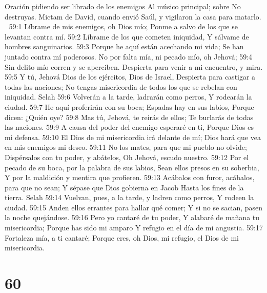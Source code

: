 Oración pidiendo ser librado de los enemigos 
Al músico principal; sobre No destruyas. Mictam de David, cuando envió Saúl, y vigilaron la casa para matarlo. 

59:1 Líbrame de mis enemigos, oh Dios mío; 
Ponme a salvo de los que se levantan contra mí. 
59:2 Líbrame de los que cometen iniquidad, 
Y sálvame de hombres sanguinarios. 
59:3 Porque he aquí están acechando mi vida; 
Se han juntado contra mí poderosos. 
No por falta mía, ni pecado mío, oh Jehová; 
59:4 Sin delito mío corren y se aperciben. 
Despierta para venir a mi encuentro, y mira. 
59:5 Y tú, Jehová Dios de los ejércitos, Dios de Israel, 
Despierta para castigar a todas las naciones; 
No tengas misericordia de todos los que se rebelan con iniquidad. Selah 
59:6 Volverán a la tarde, ladrarán como perros, 
Y rodearán la ciudad. 
59:7 He aquí proferirán con su boca; 
Espadas hay en sus labios, 
Porque dicen: ¿Quién oye? 
59:8 Mas tú, Jehová, te reirás de ellos; 
Te burlarás de todas las naciones. 
59:9 A causa del poder del enemigo esperaré en ti, 
Porque Dios es mi defensa. 
59:10 El Dios de mi misericordia irá delante de mí; 
Dios hará que vea en mis enemigos mi deseo. 
59:11 No los mates, para que mi pueblo no olvide; 
Dispérsalos con tu poder, y abátelos, 
Oh Jehová, escudo nuestro. 
59:12 Por el pecado de su boca, por la palabra de sus labios, 
Sean ellos presos en su soberbia, 
Y por la maldición y mentira que profieren. 
59:13 Acábalos con furor, acábalos, para que no sean; 
Y sépase que Dios gobierna en Jacob 
Hasta los fines de la tierra. Selah 
59:14 Vuelvan, pues, a la tarde, y ladren como perros, 
Y rodeen la ciudad. 
59:15 Anden ellos errantes para hallar qué comer; 
Y si no se sacian, pasen la noche quejándose. 
59:16 Pero yo cantaré de tu poder, 
Y alabaré de mañana tu misericordia; 
Porque has sido mi amparo 
Y refugio en el día de mi angustia. 
59:17 Fortaleza mía, a ti cantaré; 
Porque eres, oh Dios, mi refugio, el Dios de mi misericordia. 

\chapter{60}

